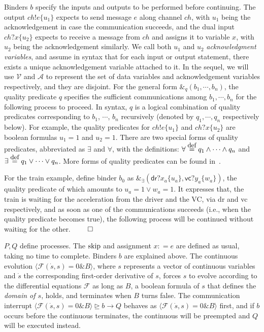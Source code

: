 \documentclass{llncs}
\newcommand{\pskip}{\textmd{skip}}
\newcommand{\evolution}[3]{\langle \mathcal{#1}(\dot{#2},#2)=0 \& #3\rangle}
\newcommand{\bexempt}[3]{#1 \unrhd #2 \rightarrow #3}
\newcommand{\Define}{\stackrel{\mbox{\small\rm def}}{=}}
\begin{document}
Binders $b$ specify the inputs and outputs to be performed before continuing.
The output  $ch!e\{u_1\}$ expects to send message $e$ along channel $ch$, with
$u_1$ being the acknowledgement in case the communication succeeds, and the
dual input $ch?x\{u_2\}$ expects to receive a message from $ch$ and assigns it to variable $x$, with
$u_2$  being the acknowledgement similarly. We call both $u_1$ and $u_2$ \emph{acknowledgment variables}, and
assume in syntax that for each input or output statement, there exists a unique acknowledgement variable attached to it.
In the sequel, we will
use $\mathcal{V}$ and $\mathcal{A}$ to represent the set of data variables and acknowledgement variables respectively,
 and they are disjoint.
For the general form $\&_q(b_1, \cdots, b_n)$, the quality predicate $q$ specifies the sufficient communications
among
 $b_1, \cdots, b_n$  for the following process to proceed. In syntax, $q$ is a logical
combination of quality predicates corresponding to $b_1$, $\cdots$, $b_n$ recursively (denoted by $q_1, \cdots, q_n$ respectively below).
For example, the quality predicates for $ch!e\{u_1\}$ and
$ch?x\{u_2\}$ are boolean formulas $u_1  = 1$ and $u_2 = 1$.
There are two special forms of quality predicates, abbreviated as $\exists$ and $\forall$, with the definitions:
$
  \forall \Define q_1 \wedge \cdots \wedge q_n$ and $\exists \Define q_1 \vee \cdots \vee q_n
$.
More forms of quality predicates can be found in~\cite{RNV12}.

\example For the train example, define binder $b_0$ as
$\&_\exists(\textsf{dr}?x_a\{u_a\}, \textsf{vc}?y_a\{w_a\})$,
the quality predicate
of which amounts to $u_a=1 \vee w_a = 1$.
It expresses that,
the train is waiting for the acceleration from the driver and the VC, via \textsf{dr} and \textsf{vc} respectively,
and
as soon as one of the communications succeeds (i.e., when the quality predicate becomes true),
the following process will be continued without waiting for the other. $\qed$

 $P, Q$ define processes. The
$\pskip$ and assignment $x: = e$ are defined as usual, taking no time to complete.
Binders $b$ are explained above.
The continuous evolution $\evolution{F}{s}{B}$, where $s$ represents a vector of continuous variables and
$\dot{s}$ the corresponding  first-order derivative of $s$,
forces  $s$ to evolve according to the differential equations $\mathcal F$ as long as $B$,
a boolean formula of $s$ that  defines the {\em domain of $s$}, holds, and terminates when $B$ turns false. The communication interrupt $\bexempt{\evolution{F}{s}{B}}{b}{Q}$ behaves as $\evolution{F}{s}{B}$ first,
and if $b$ occurs before the continuous terminates,  the continuous  will be preempted  and
$Q$ will be executed instead.
\end{document}

